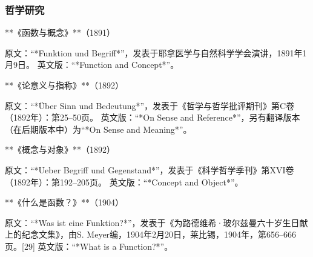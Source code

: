 \subsubsection{哲学研究}  
**《函数与概念》**（1891）

原文：“*Funktion und Begriff*”，发表于耶拿医学与自然科学学会演讲，1891年1月9日。  
英文版：“*Function and Concept*”。

**《论意义与指称》**（1892）

原文：“*Über Sinn und Bedeutung*”，发表于《哲学与哲学批评期刊》第C卷（1892年）：第25–50页。  
英文版：“*On Sense and Reference*”，另有翻译版本（在后期版本中）为“*On Sense and Meaning*”。

**《概念与对象》**（1892）

原文：“*Ueber Begriff und Gegenstand*”，发表于《科学哲学季刊》第XVI卷（1892年）：第192–205页。  
英文版：“*Concept and Object*”。

**《什么是函数？》**（1904）

原文：“*Was ist eine Funktion?*”，发表于《为路德维希·玻尔兹曼六十岁生日献上的纪念文集》，由S. Meyer编，1904年2月20日，莱比锡，1904年，第656–666页。[29]  
英文版：“*What is a Function?*”。